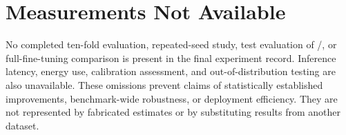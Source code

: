 \section{Measurements Not Available}
No completed ten-fold evaluation, repeated-seed study, test evaluation of /, or full-fine-tuning comparison is present in the final experiment record. Inference latency, energy use, calibration assessment, and out-of-distribution testing are also unavailable. These omissions prevent claims of statistically established improvements, benchmark-wide robustness, or deployment efficiency. They are not represented by fabricated estimates or by substituting results from another dataset.

